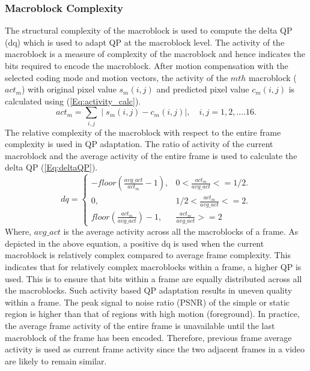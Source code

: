 \documentclass[11pt]{article} %
\begin{document}
\subsubsection{Macroblock Complexity}	
	The structural complexity of the macroblock is used to compute the delta QP (dq) which is used to adapt QP at the macroblock level. The activity of the macroblock is a measure of complexity of the macroblock and hence indicates the bits required to encode the macroblock. After motion compensation with the selected coding mode and motion vectors, the activity of the $mth$ macroblock ($act_m$) with original pixel value $s_m(i,j)$ and predicted pixel value $c_m(i,j)$ is calculated using (\ref{Eq:activity_calc}). 
\begin{equation}
	\label{Eq:activity_calc}
	act_m = \sum_{i,j} \mid s_m(i,j)-c_m(i,j) \mid ,\quad	i,j = 1,2,....16.
\end{equation}	
	 The relative complexity of the macroblock with respect to the entire frame complexity is used in QP adaptation. The ratio of activity of the current macroblock and the average activity of the entire frame is used to calculate the delta QP (\ref{Eq:deltaQP}).
\begin{equation}
	\label{Eq:deltaQP}
	dq = \begin{cases}
		-floor(\frac{avg\_act} {act_m} - 1), &  0 < \frac{act_m}{avg\_act} <= 1/2.\\
		0, & 1/2 < \frac{act_m}{avg\_act} <= 2.\\
		floor(\frac{act_m} {avg\_act}) - 1, & \frac{act_m}{avg\_act} >= 2
	\end{cases}
\end{equation}
Where, $avg\_act$ is the average activity across all the macroblocks of a frame. As depicted in the above equation, a positive dq is used when the current macroblock is relatively complex compared to average frame complexity. This indicates that for relatively complex macroblocks within a frame, a higher QP is used. This is to ensure that bits within a frame are equally distributed across all the macroblocks. Such activity based QP adaptation results in uneven quality within a frame. The peak signal to noise ratio (PSNR) of the simple or static region is higher than that of regions with high motion (foreground). In practice, the average frame activity of the entire frame is unavailable until the last macroblock of the frame has been encoded. Therefore, previous frame average activity is used as current frame activity since the two adjacent frames in a video are likely to remain similar. 
\end{document}
